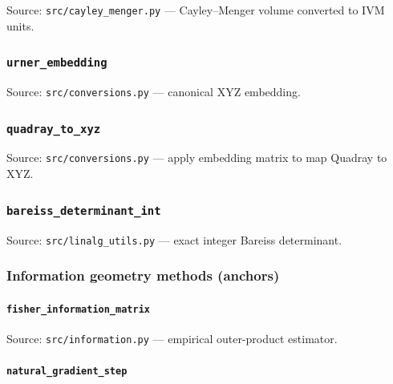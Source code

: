 \documentclass[
]{article}
\begin{document}
Source: \texttt{src/cayley\_menger.py} --- Cayley--Menger volume
converted to IVM units.

\hypertarget{code:urner_embedding}{%
\subsubsection{\texorpdfstring{\texttt{urner\_embedding}}{urner\_embedding}}\label{code:urner_embedding}}

Source: \texttt{src/conversions.py} --- canonical XYZ embedding.

\hypertarget{code:quadray_to_xyz}{%
\subsubsection{\texorpdfstring{\texttt{quadray\_to\_xyz}}{quadray\_to\_xyz}}\label{code:quadray_to_xyz}}

Source: \texttt{src/conversions.py} --- apply embedding matrix to map
Quadray to XYZ.

\hypertarget{code:bareiss_determinant_int}{%
\subsubsection{\texorpdfstring{\texttt{bareiss\_determinant\_int}}{bareiss\_determinant\_int}}\label{code:bareiss_determinant_int}}

Source: \texttt{src/linalg\_utils.py} --- exact integer Bareiss
determinant.

\hypertarget{information-geometry-methods-anchors}{%
\subsubsection{Information geometry methods
(anchors)}\label{information-geometry-methods-anchors}}

\hypertarget{code:fisher_information_matrix}{%
\paragraph{\texorpdfstring{\texttt{fisher\_information\_matrix}}{fisher\_information\_matrix}}\label{code:fisher_information_matrix}}

Source: \texttt{src/information.py} --- empirical outer-product
estimator.

\hypertarget{code:natural_gradient_step}{%
\paragraph{\texorpdfstring{\texttt{natural\_gradient\_step}}{natural\_gradient\_step}}\label{code:natural_gradient_step}}
\end{document}
